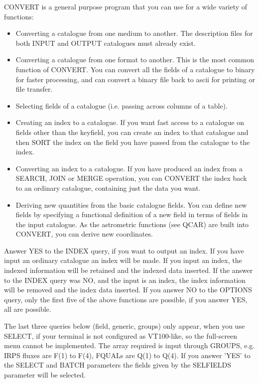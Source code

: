 CONVERT is a general purpose program that you can use for
a wide variety of functions:
\begin{itemize}
\item Converting a catalogue from one medium to another.
The description files for both INPUT and OUTPUT catalogues must already exist.
\item Converting a catalogue from one format to another.
This is the most common function of CONVERT.
You can convert all the fields of a catalogue to binary for faster processing,
and can convert a binary file back to ascii for printing or file transfer.
\item Selecting fields of a catalogue (i.e. passing across columns of a table).
\item Creating an index to a catalogue.
If you want fast access to a catalogue on fields other than the keyfield, you
can create an index to that catalogue and then SORT the index on the field you
have passed from the catalogue to the index.
\item Converting an index to a catalogue.
If you have produced an index from a SEARCH, JOIN or MERGE operation, you can
CONVERT the index back to an ordinary catalogue, containing just the data you
want.
\item Deriving new quantities from the basic catalogue fields.
You can define new fields by specifying a functional definition of a new field
in terms of fields in the input catalogue.
As the astrometric functions (see QCAR) are built into CONVERT, you can derive
new coordinates.
\end{itemize}
Answer YES to the INDEX query, if you want to output an index.
If you have input an ordinary catalogue an index will be made.
If you input an index, the indexed information will be retained and the indexed
data inserted. If the answer to the INDEX query was NO, and the input is an
index, the index information will be removed and the index data inserted.
If you answer NO to the OPTIONS query, only the first five of the above
functions are possible, if you answer YES, all are possible.

The last three queries below (field, generic, groups) only appear, when you use
SELECT, if your terminal is not configured as VT100-like, so the full-screen
menu cannot be implemented.
The array required is input through GROUPS, e.g. IRPS fluxes are F(1) to
F(4), FQUALs are Q(1) to Q(4).
If you answer 'YES' to the SELECT and BATCH parameters the fields given by the
SELFIELDS parameter will be selected.

